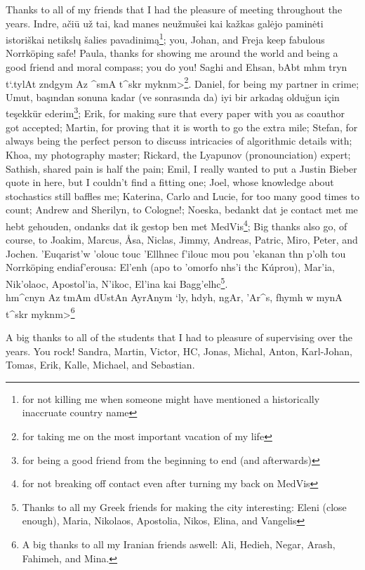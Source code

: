 Thanks to all of my friends that I had the pleasure of meeting throughout the years. Indre, a\v{c}i\={u} u\v{z} tai, kad manes neu\v{z}mu\v{s}ei kai ka\v{z}kas gal\.{e}jo pamin\.{e}ti istori\v{s}kai netiksl\k{u} \v{s}alies pavadinim\k{a}\footnote{for not killing me when someone might have mentioned a historically inaccruate country name}; you, Johan, and Freja keep fabulous Norrk\"oping safe! Paula, thanks for showing me around the world and being a good friend and moral compass; you do you! Saghi and Ehsan, {\small \<bAbt mhm tryn t`.tylAt zndgym Az ^smA t^skr myknm>}\footnote{for taking me on the most important vacation of my life}. Daniel, for being my partner in crime; Umut, ba\c{s}{\i}ndan sonuna kadar (ve sonras{\i}nda da) iyi bir arkada\c{s} oldu\u{g}un i\c{c}in te\c{s}ekk\"ur ederim\footnote{for being a good friend from the beginning to end (and afterwards)}; Erik, for making sure that every paper with you as coauthor got accepted; Martin, for proving that it is worth to go the extra mile; Stefan, for always being the perfect person to discuss intricacies of algorithmic details with; Khoa, my photography master; Rickard, the Lyapunov (pronounciation) expert; Sathish, shared pain is half the pain; Emil, I really wanted to put a Justin Bieber quote in here, but I couldn't find a fitting one; Joel, whose knowledge about stochastics still baffles me; Katerina, Carlo and Lucie, for too many good times to count; Andrew and Sherilyn, to Cologne!; Noeska, bedankt dat je contact met me hebt gehouden, ondanks dat ik gestop ben met MedVis\footnote{for not breaking off contact even after turning my back on MedVis}; Big thanks also go, of course, to Joakim, Marcus, \AA sa, Niclas, Jimmy, Andreas, Patric, Miro, Peter, and Jochen. \textgreek{'Euqarist'w 'olouc touc 'Ellhnec f'ilouc mou pou 'ekanan thn p'olh tou} Norrk\"oping \textgreek{endiaf'erousa: El'enh (apo to 'omorfo nhs'i thc K\'uprou), Mar'ia, Nik'olaoc, Apostol'ia, N'ikoc, El'ina kai Bagg'elhc}\footnote{Thanks to all my Greek friends for making the city interesting: Eleni (close enough), Maria, Nikolaos, Apostolia, Nikos, Elina, and Vangelis}. \\{\small \<hm^cnyn Az tmAm dUstAn AyrAnym `ly, hdyh, ngAr, 'Ar^s, fhymh w mynA t^skr myknm>}\footnote{A big thanks to all my Iranian friends aswell: Ali, Hedieh, Negar, Arash, Fahimeh, and Mina.}

A big thanks to all of the students that I had to pleasure of supervising over the years. You rock! Sandra, Martin, Victor, HC, Jonas, Michal, Anton, Karl-Johan, Tomas, Erik, Kalle, Michael, and Sebastian.

